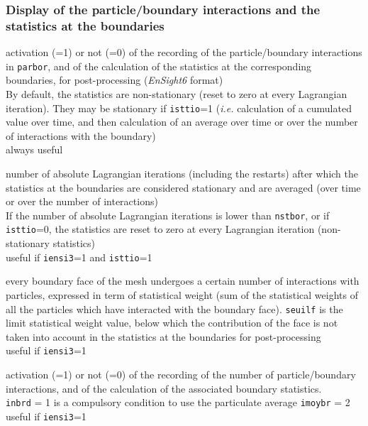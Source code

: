 \subsubsection{Display of the particle/boundary interactions and the statistics at the boundaries}

{activation (=1) or not (=0) of the recording of the particle/boundary
interactions in  \texttt{parbor}, and of the calculation of the
statistics at the corresponding boundaries, for post-processing
(\textit{EnSight6} format)\\
By default, the statistics are non-stationary (reset to zero at every
Lagrangian iteration). They may be stationary if \texttt{isttio}=1 ({\em i.e.}
calculation of a cumulated value over time, and then calculation of an
average over time or over the number of interactions with the boundary)\\
always useful}

{number of absolute Lagrangian iterations (including the restarts)
after which the statistics at the boundaries are considered stationary and are
averaged (over time or over the number of interactions)\\
If the number of absolute Lagrangian iterations is lower than \texttt{nstbor},
or if \texttt{isttio}=0, the statistics are reset to zero at every
Lagrangian iteration (non-stationary statistics)\\
useful if \texttt{iensi3}=1 and \texttt{isttio}=1}

{every boundary face of the mesh undergoes a certain number of
interactions with particles, expressed in term of statistical weight
(sum of the statistical weights of all the particles which have
interacted with the boundary face). \texttt{seuilf} is
the limit statistical weight value, below which the contribution of the
face is not taken into account in the
statistics at the boundaries for post-processing\\
useful if \texttt{iensi3}=1}

{activation (=1) or not (=0) of the recording of the number of particle/boundary
interactions, and of the calculation of the associated boundary statistics.\\
\texttt{inbrd} = 1 is a compulsory condition to use the particulate average
\texttt{imoybr} = 2\\
useful if \texttt{iensi3}=1}

